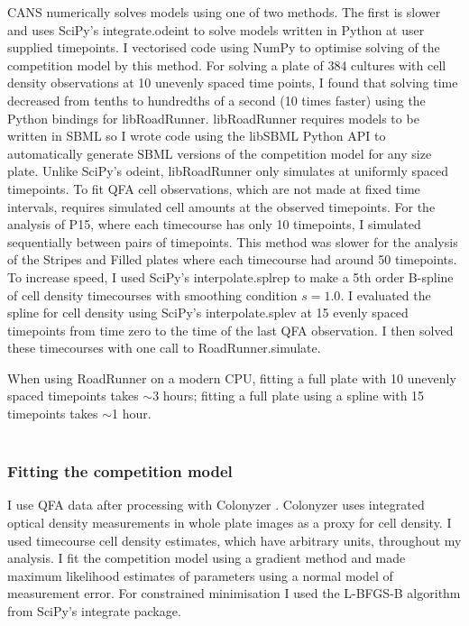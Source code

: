 CANS numerically solves models using one of two methods. The first is
slower and uses SciPy's integrate.odeint to solve models written in
Python at user supplied timepoints. I vectorised code using NumPy to
optimise solving of the competition model by this method. For solving
a plate of 384 cultures with cell density observations at 10 unevenly
spaced time points, I found that solving time decreased from tenths to
hundredths of a second (10 times faster) using the Python bindings for
libRoadRunner. libRoadRunner requires models to be written in SBML so
I wrote code using the libSBML Python API to automatically generate
SBML versions of the competition model for any size plate.
Unlike SciPy's odeint, libRoadRunner only simulates at uniformly
spaced timepoints. To fit QFA cell observations, which are not made at
fixed time intervals, requires simulated cell amounts at the observed
timepoints. For the analysis of P15, where each timecourse has only 10
timepoints, I simulated sequentially between pairs of timepoints. This
method was slower for the analysis of the Stripes and Filled plates
where each timecourse had around 50 timepoints. To increase speed, I
used SciPy's interpolate.splrep to make a 5th order B-spline of cell
density timecourses with smoothing condition \(s=1.0\). I evaluated
the spline for cell density using SciPy's interpolate.splev at 15
evenly spaced timepoints from time zero to the time of the last QFA
observation. I then solved these timecourses with one call to
RoadRunner.simulate.

When using RoadRunner on a modern CPU, fitting a full plate with 10
unevenly spaced timepoints takes \(\sim\)3 hours; fitting a full
plate using a spline with 15 timepoints takes \(\sim\)1 hour.
\\\\

\subsubsection{Fitting the competition model}
\label{sec:fitting_comp}

I use QFA data after processing with Colonyzer \citep{Lawless2010}.
Colonyzer uses integrated optical density measurements in whole plate
images as a proxy for cell density. I used timecourse cell density
estimates, which have arbitrary units, throughout my analysis. I fit
the competition model using a gradient method and made maximum
likelihood estimates of parameters using a normal model of measurement
error. For constrained minimisation I used the L-BFGS-B algorithm from
SciPy's integrate package.

